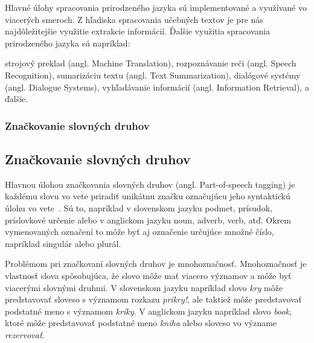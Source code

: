 Hlavné úlohy spracovania prirodzeného jazyka sú implementované a využívané vo viacerých smeroch. Z hľadiska spracovania učebných textov je pre nás najdôležitejšie využitie extrakcie informácií. Ďalšie využitia spracovania prirodzeného jazyka sú napríklad:~\cite{Preeti}
\begin{my_itemize}
	\myitem strojový preklad (angl. Machine Translation),
	\myitem rozpoznávanie reči (angl. Speech Recognition),
	\myitem sumarizáciu textu (angl. Text Summarization),
	\myitem dialógové systémy (angl. Dialogue Systems),
	\myitem vyhľadávanie informácií (angl. Information Retrieval),
	\myitem a ďalšie.
\end{my_itemize}

%
%
{
	\subsubsection{Značkovanie slovných druhov}
}
{
	\subsection{Značkovanie slovných druhov}
}
\label{subsubsec:postagging}
Hlavnou úlohou značkovania slovných druhov (angl. Part-of-speech tagging) je každému slovu vo vete priradiť unikátnu značku označujúcu jeho syntaktickú úlohu vo vete~\cite{collobert2011}. Sú to, napríklad v slovenskom jazyku podmet, prísudok, príslovkové určenie alebo v anglickom jazyku noun, adverb, verb, atď. Okrem vymenovaných označení to môže byť aj označenie určujúce množné číslo, napríklad singulár alebo plurál.

Problémom pri značkovaní slovných druhov je mnohoznačnosť. Mnohoznačnosť je vlastnosť slova spôsobujúca, že slovo môže mať viacero významov a môže byť viacerými slovnými druhmi. V slovenskom jazyku napríklad slovo \textit{kry} môže predstavovať sloveso s významom rozkazu \textit{prikry!}, ale taktiež môže predstavovať podstatné meno s významom \textit{kríky}. V anglickom jazyku napríklad slovo \textit{book}, ktoré môže predstavovať podstatné meno \textit{kniha} alebo sloveso vo význame \textit{rezervovať}.

